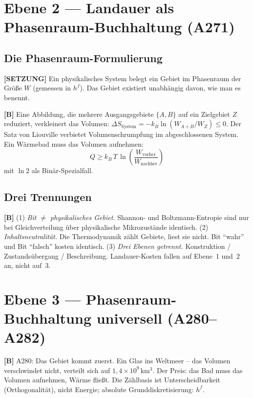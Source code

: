\section{Ebene 2 --- Landauer als Phasenraum-Buchhaltung (A271)}

\subsection{Die Phasenraum-Formulierung}

\textbf{[SETZUNG]} Ein physikalisches System belegt ein Gebiet im
Phasenraum der Größe $W$ (gemessen in $h^f$). Das Gebiet existiert
unabhängig davon, wie man es benennt.

\textbf{[B]} Eine Abbildung, die mehrere Ausgangsgebiete $\{A, B\}$
auf ein Zielgebiet $Z$ reduziert, verkleinert das Volumen:
$\Delta S_\text{System} = -k_B \ln(W_{A+B}/W_Z) \le 0$.
Der Satz von Liouville verbietet Volumenschrumpfung im abgeschlossenen
System. Ein Wärmebad muss das Volumen aufnehmen:
\[
\boxed{Q \ge k_B\,T\,\ln\!\left(\frac{W_\text{vorher}}{W_\text{nachher}}\right)}
\]
mit $\ln 2$ als Binär-Spezialfall.

\subsection{Drei Trennungen}

\textbf{[B]}
(1) \emph{Bit $\ne$ physikalisches Gebiet.} Shannon- und Boltzmann-Entropie
sind nur bei Gleichverteilung über physikalische Mikrozustände identisch.
(2) \emph{Inhaltsneutralität.} Die Thermodynamik zählt Gebiete, liest sie
nicht. Bit \enquote{wahr} und Bit \enquote{falsch} kosten identisch.
(3) \emph{Drei Ebenen getrennt.} Konstruktion / Zustandsübergang / Beschreibung.
Landauer-Kosten fallen auf Ebene~1 und~2 an, nicht auf~3.

\section{Ebene 3 --- Phasenraum-Buchhaltung universell (A280--A282)}

\textbf{[B]} A280: Das Gebiet kommt zuerst. Ein Glas ins Weltmeer –
das Volumen verschwindet nicht, verteilt sich auf
$1{,}4 \times 10^9$\,km$^3$. Der Preis: das Bad muss das Volumen
aufnehmen, Wärme fließt. Die Zählbasis ist Unterscheidbarkeit
(Orthogonalität), nicht Energie; absolute Grunddiskretisierung: $h^f$.

